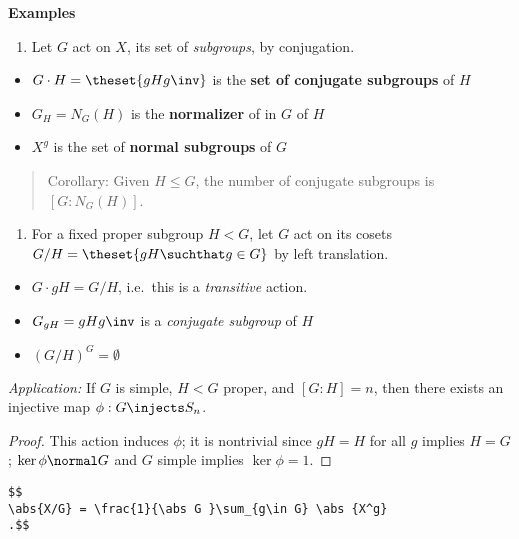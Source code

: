 \textbf{Examples}

\begin{enumerate}
\def\labelenumi{\arabic{enumi}.}
\tightlist
\item
  Let \(G\) act on \(X\), its set of \emph{subgroups}, by conjugation.
\end{enumerate}

\begin{itemize}
\item
  \(G\cdot H = \theset{gHg\inv}\) is the \textbf{set of conjugate
  subgroups} of \(H\)
\item
  \(G_H = N_G(H)\) is the \textbf{normalizer} of in \(G\) of \(H\)
\item
  \(X^g\) is the set of \textbf{normal subgroups} of \(G\)
\end{itemize}

\begin{quote}
Corollary: Given \(H \leq G\), the number of conjugate subgroups is
\([G: N_G(H)]\).
\end{quote}

\begin{enumerate}
\def\labelenumi{\arabic{enumi}.}
\tightlist
\item
  For a fixed proper subgroup \(H< G\), let \(G\) act on its cosets
  \(G/H = \theset{gH\suchthat g\in G}\) by left translation.
\end{enumerate}

\begin{itemize}
\item
  \(G\cdot gH = G/H\), i.e.~this is a \emph{transitive} action.
\item
  \(G_{gH} = gHg\inv\) is a \emph{conjugate subgroup} of \(H\)
\item
  \((G/H)^G = \emptyset\)
\end{itemize}

\emph{Application:} If \(G\) is simple, \(H < G\) proper, and
\([G:H] = n\), then there exists an injective map
\(\phi: G \injects S_n\).

\begin{proof}

This action induces \(\phi\); it is nontrivial since \(gH = H\) for all
\(g\) implies \(H = G\); \(\ker \phi \normal G\) and \(G\) simple
implies \(\ker \phi = 1\).

\end{proof}

\begin{theorem}

\begin{verbatim}
$$
\abs{X/G} = \frac{1}{\abs G }\sum_{g\in G} \abs {X^g}
.$$
\end{verbatim}

\end{theorem}

